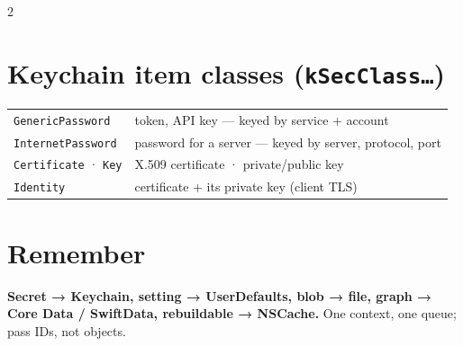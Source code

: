 \documentclass[8pt]{extarticle}
\begin{document}
\begin{multicols}{2}
\section{Keychain item classes (\texttt{kSecClass…})}
{\footnotesize
\begin{tabular}{@{}l l@{}}
\toprule
\texttt{GenericPassword} & token, API key — keyed by service + account \\
\texttt{InternetPassword} & password for a server — keyed by server, protocol, port \\
\texttt{Certificate} · \texttt{Key} & X.509 certificate · private/public key \\
\texttt{Identity} & certificate + its private key (client TLS) \\
\bottomrule
\end{tabular}}

\section{Remember}
\textbf{Secret → Keychain, setting → UserDefaults, blob → file, graph → Core Data /
SwiftData, rebuildable → NSCache.} One context, one queue; pass IDs, not objects.


\end{multicols}

\end{document}
